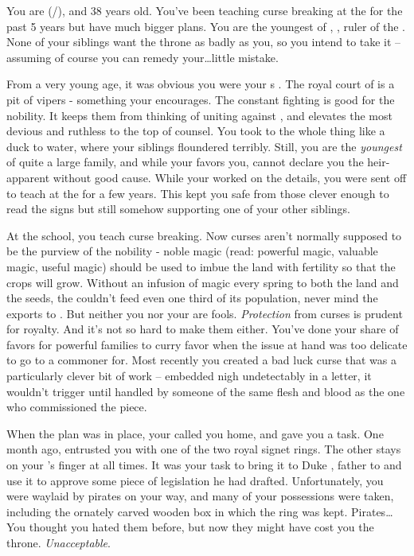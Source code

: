 \documentclass[char]{GL2020}
\begin{document}
\name{\cPrince{}}

You are \cPrince{} (\cPrince{\they}/\cPrince{\them}), and 38 years old. You’ve been teaching curse breaking at the \pSchool{} for the past 5 years but have much bigger plans. You are the youngest \cPrince{\child} of \cQueen{\Majesty}, \cQueen{}, ruler of the \pFarm{}. None of your siblings want the throne as badly as you, so you intend to take it -- assuming of course you can remedy your\ldots little mistake.

From a very young age, it was obvious you were your \cQueen{\parent}s \cPrince{\child}. The royal court of \pFarm{} is a pit of vipers - something your \cQueen{\parent} encourages. The constant fighting is good for the nobility. It keeps them from thinking of uniting against \cQueen{\them}, and elevates the most devious and ruthless to the top of \cQueen{\their} counsel. You took to the whole thing like a duck to water, where your siblings floundered terribly.  Still, you are the \emph{youngest} of quite a large family, and while your \cQueen{\parent} favors you, \cQueen{\they} cannot declare you the heir-apparent without good cause. While your \cQueen{\parent} worked on the details, you were sent off to teach at the \pSchool{} for a few years. This kept you safe from those clever enough to read the signs but still somehow supporting one of your other siblings. 

At the school, you teach curse breaking. Now curses aren’t normally supposed to be the purview of the nobility - noble magic (read: powerful magic, valuable magic, useful magic) should be used to imbue the land with fertility so that the crops will grow. Without an infusion of magic every spring to both the land and the seeds, the \pFarm{} couldn’t feed even one third of its population, never mind the exports to \pTech{}. But neither you nor your \cQueen{\parent} are fools. \emph{Protection} from curses is prudent for royalty. And it’s not so hard to make them either. You’ve done your share of favors for powerful families to curry favor when the issue at hand was too delicate to go to a commoner for. Most recently you created a bad luck curse that was a particularly clever bit of work -- embedded nigh undetectably in a letter, it wouldn’t trigger until handled by someone of the same flesh and blood as the one who commissioned the piece.

When the plan was in place, your \cQueen{\parent} called you home, and gave you a task. One month ago, \cQueen{\They} entrusted you with one of the two royal signet rings. The other stays on your \cQueen{\parent}’s finger at all times. It was your task to bring it to Duke \cChupStudent{\formal}, father to \cChupStudent{} and use it to approve some piece of legislation he had drafted. Unfortunately, you were waylaid by pirates on your way, and many of your possessions were taken, including the ornately carved wooden box in which the ring was kept. Pirates\ldots You thought you hated them before, but now they might have cost you the throne. \emph{Unacceptable}.
\end{document}
